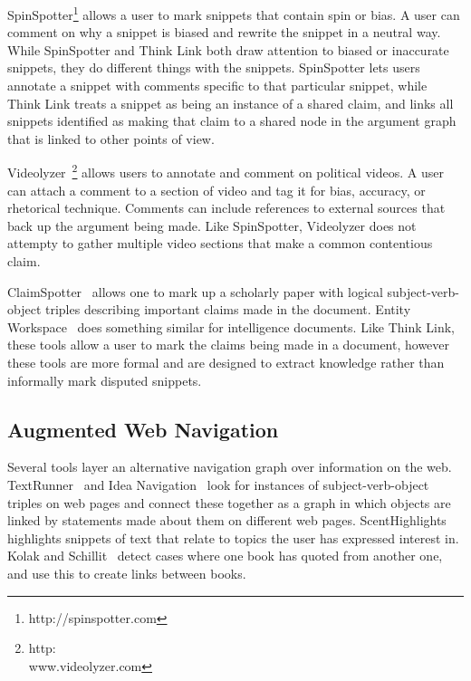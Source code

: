 \documentclass{chi2009}
\newcommand{\todo}[1]{}
\begin{document}
SpinSpotter\footnote{http://spinspotter.com} allows a user to mark snippets that contain spin or bias. A user can comment on why a snippet is biased and rewrite the snippet in a neutral way. While SpinSpotter and Think Link both draw attention to biased or inaccurate snippets, they do different things with the snippets. SpinSpotter lets users annotate a snippet with comments specific to that particular snippet, while Think Link treats a snippet as being an instance of a shared claim, and links all snippets identified as making that claim to a shared node in the argument graph that is linked to other points of view.

Videolyzer~\cite{Diakopoulos2008}\footnote{http:\\www.videolyzer.com} allows users to annotate and comment on political videos. A user can attach a comment to a section of video and tag it for bias, accuracy, or rhetorical technique. Comments can include references to external sources that back up the argument being made. Like SpinSpotter, Videolyzer does not attempty to gather multiple video sections that make a common contentious claim.

ClaimSpotter~\cite{Sereno2005,Sereno2004} allows one to mark up a scholarly paper with logical subject-verb-object triples describing important claims made in the document. Entity Workspace~\cite{Bier2006} does something similar for intelligence documents. Like Think Link, these tools allow a user to mark the claims being made in a document, however these tools are more formal and are designed to extract knowledge rather than informally mark disputed snippets.


\todo{Ask Nicholas if he would like to read the paper}

\subsection{Augmented Web Navigation}

Several tools layer an alternative navigation graph over information on the web. TextRunner~\cite{Etzioni2008} and Idea Navigation~\cite{Etzioni2008} look for instances of subject-verb-object triples on web pages and connect these together as a graph in which objects are linked by statements made about them on different web pages. ScentHighlights~\cite{Chi2005a} highlights snippets of text that relate to topics the user has expressed interest in. Kolak and Schillit~\cite{Kolak2008} detect cases where one book has quoted from another one, and use this to create links between books. 
\end{document}
